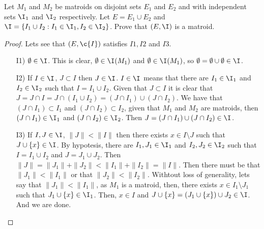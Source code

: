 \prob
{
    Let $M_1$ and $M_2$ be matroids on disjoint sets $E_1$ and $E_2$ and with independent sets
    $\I_1$ and $\I_2$ respectively. Let $E = E_1 \cup E_2$ and 
    $\I = \{ I_1 \cup I_2 : I_1 \in \I_1, I_2 \in \I_2\}$. Prove that $(E, \I)$ is a
    matroid.
}

\begin{proof}
    Lets see that $(E, \c{I})$ satisfies $I1, I2$ and $I3$.\pn
    
    
    \begin{enumerate}
        \item[I1)]
            $\emptyset \in \I$. This is clear, $\emptyset \in \I(M_1)$ and $\emptyset \in \I(M_1)$, so 
            $\emptyset = \emptyset \cup \emptyset \in \I$.
        \item[I2)]
            If $I \in \I$, $J \subset I$ then $J \in \I$. $I \in \I$ means that there are $I_1 \in \I_1$
            and $I_2 \in \I_2$ such that $I = I_1 \cup I_2$. Given that $J \subset I$ it is clear that
            $J = J \cap I = J \cap (I_1 \cup I_2) = (J \cap I_1) \cup (J \cap I_2)$. We have that $(J \cap I_1) 
            \subset I_1$ and $(J \cap I_2) \subset I_2$, given that $M_1$ and $M_2$
            are matroids, then $(J \cap I_1) \in \I_1$ and $(J \cap I_2) \in \I_2$. Then $J = (J \cap I_1) \cup (J \cap I_2) \in \I$.
        \item[I3)] 
            If $I, J \in \I$, $\|J\| < \|I\|$ then there exists $x \in I \setminus J$ such that $J \cup \{x\} \in \I$.
            By hypotesis, there are $I_1, J_1 \in \I_1$ and $I_2, J_2 \in \I_2$ such that $I = I_1 \cup I_2$ and $J = J_1 \cup J_2$.
            Then $\|J\| = \|J_1\| + \|J_2\| <  \|I_1\| + \|I_2\| = \|I\|$. Then there must be that $\|J_1\| < \|I_1\|$ or
            that $\|J_2\| < \|I_2\|$. Withtout loss of generality, lets say that $\|J_1\| < \|I_1\|$, as $M_1$ is a matroid,
            then, there exists $x \in I_1 \setminus J_1$ such that $J_1 \cup \{x\} \in \I_1$. Then, $x \in I$ and 
            $J \cup \{x\} = (J_1 \cup \{ x \}) \cup J_2 \in \I$. And we are done.
            
    \end{enumerate}
\end{proof}